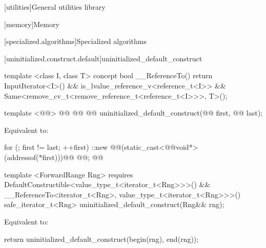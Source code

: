\setcounter{chapter}{19}
[utilities]{General utilities library}

\setcounter{section}{6}
[memory]{Memory}

\setcounter{subsection}{11}
[specialized.algorithms]{Specialized algorithms}

[uninitialized.construct.default]{uninitialized_default_construct}

{\color{addclr}
\begin{codeblock}
template <class I, class T>
concept bool __ReferenceTo() {
  return InputIterator<I>() &&
    is_lvalue_reference_v<reference_t<I>> &&
    Same<remove_cv_t<remove_reference_t<reference_t<I>>>, T>();
}
\end{codeblock}
} %

\begin{codeblock}
  template <@@>
    @@
             @@
    @@ uninitialized_default_construct(@@ first, @@ last);
\end{codeblock}

\setcounter{Paras}{0}
\pnum
\effects Equivalent to:
\begin{codeblock}
        for (; first != last; ++first)
          ::new @@(static_cast<@@void*>(addressof(*first)))@\added{)}@
            @@;
        @@
\end{codeblock}

{\color{addclr}
\begin{codeblock}
  template <ForwardRange Rng>
    requires DefaultConstructible<value_type_t<iterator_t<Rng>>>() &&
             __ReferenceTo<iterator_t<Rng>, value_type_t<iterator_t<Rng>>>()
  safe_iterator_t<Rng> uninitialized_default_construct(Rng&& rng);
\end{codeblock}

\pnum
\effects Equivalent to:
\begin{codeblock}
        return uninitialized_default_construct(begin(rng), end(rng));
\end{codeblock}
} %

